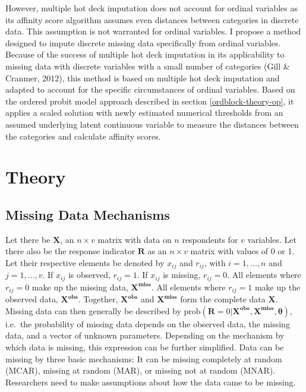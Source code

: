 \documentclass[12pt,econ]{sources/authesis}
\begin{document}
However, multiple hot deck imputation does not account for ordinal variables as its affinity score algorithm assumes even distances between categories in discrete data. This assumption is not warranted for ordinal variables. I propose a method designed to impute discrete missing data specifically from ordinal variables. Because of the success of multiple hot deck imputation in its applicability to missing data with discrete variables with a small number of categories (Gill \& Cranmer, 2012), this method is based on multiple hot deck imputation and adapted to account for the specific circumstances of ordinal variables. Based on the ordered probit model approach described in section \ref{ordblock-theory-op}, it applies a scaled solution with newly estimated numerical thresholds from an assumed underlying latent continuous variable to measure the distances between the categories and calculate affinity scores.

\hypertarget{ordmiss-theory}{%
\section{Theory}\label{ordmiss-theory}}

\hypertarget{ordmiss-theory-mechanisms}{%
\subsection{Missing Data Mechanisms}\label{ordmiss-theory-mechanisms}}

Let there be \(\bm{X}\), an \(n \times v\) matrix with data on \(n\) respondents for \(v\) variables. Let there also be the response indicator \(\bm{R}\) as an \(n \times v\) matrix with values of 0 or 1. Let their respective elements be denoted by \(x_{ij}\) and \(r_{ij}\), with \(i = 1, ..., n\) and \(j = 1, ..., v\). If \(x_{ij}\) is observed, \(r_{ij} = 1\). If \(x_{ij}\) is missing, \(r_{ij} = 0\). All elements where \(r_{ij} = 0\) make up the missing data, \(\bm{X^{miss}}\). All elements where \(r_{ij} = 1\) make up the observed data, \(\bm{X^{obs}}\). Together, \(\bm{X^{obs}}\) and \(\bm{X^{miss}}\) form the complete data \(\bm{X}\). Missing data can then generally be described by \(\text{prob}(\bm{R} = 0 | \bm{X^{obs}}, \bm{X^{miss}}, \bm{\theta})\), i.e.~the probability of missing data depends on the observed data, the missing data, and a vector of unknown parameters. Depending on the mechanism by which data is missing, this expression can be further simplified. Data can be missing by three basic mechanisms: It can be missing completely at random (MCAR), missing at random (MAR), or missing not at random (MNAR). Researchers need to make assumptions about how the data came to be missing.
\end{document}
